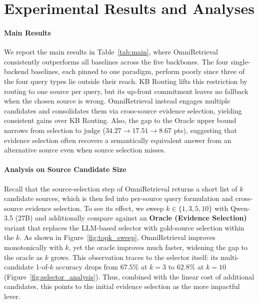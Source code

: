 \section{Experimental Results and Analyses}
\label{sec:results}

\paragraph{Main Results}
We report the main results in Table~\ref{tab:main}, where OmniRetrieval consistently outperforms all baselines across the five backbones. The four single-backend baselines, each pinned to one paradigm, perform poorly since three of the four query types lie outside their reach. KB Routing lifts this restriction by routing to one source per query, but its up-front commitment leaves no fallback when the chosen source is wrong. OmniRetrieval instead engages multiple candidates and consolidates them via cross-source evidence selection, yielding consistent gains over KB Routing. Also, the gap to the Oracle upper bound narrows from selection to judge ($34.27 \to 17.51 \to 8.67$ pts), suggesting that evidence selection often recovers a semantically equivalent answer from an alternative source even when source selection misses.




\paragraph{Analysis on Source Candidate Size}
Recall that the source-selection step of OmniRetrieval returns a short list of $k$ candidate sources, which is then fed into per-source query formulation and cross-source evidence selection. To see its effect, we sweep $k \in \{1, 3, 5, 10\}$ with Qwen-3.5 (27B) and additionally compare against an \textbf{Oracle (Evidence Selection)} variant that replaces the LLM-based selector with gold-source selection within the $k$. As shown in Figure~\ref{fig:topk_sweep}, OmniRetrieval improves monotonically with $k$, yet the oracle improves much faster, widening the gap to the oracle as $k$ grows. This observation traces to the selector itself: its multi-candidate 1-of-$k$ accuracy drops from $67.5\%$ at $k{=}3$ to $62.8\%$ at $k{=}10$ (Figure~\ref{fig:selector_analysis}). Thus, combined with the linear cost of additional candidates, this points to the initial evidence selection as the more impactful lever.

